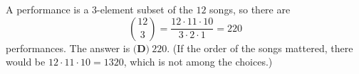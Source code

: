 A performance is a $3$-element subset of the $12$ songs, so there are
\[
\binom{12}{3}=\dfrac{12\cdot11\cdot10}{3\cdot2\cdot1}=220
\]
performances. The answer is $\boxed{\textbf{(D)}\ 220}$. (If the order of the songs mattered, there would be $12\cdot11\cdot10=1320$, which is not among the choices.)
